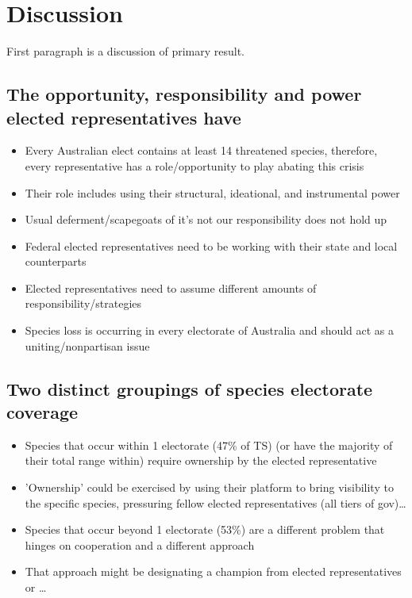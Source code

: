 \documentclass[a4paper,11pt]{article}
\begin{document}
\section{Discussion}

First paragraph is a discussion of primary result.

\subsection{The opportunity, responsibility and power elected representatives have}

\begin{itemize}
    \item Every Australian elect contains at least 14 threatened species, therefore, every representative has a role/opportunity to play abating this crisis
    \item Their role includes using their structural, ideational, and instrumental power
    \item Usual deferment/scapegoats of it's not our responsibility does not hold up
    \item Federal elected representatives need to be working with their state and local counterparts
    \item Elected representatives need to assume different amounts of responsibility/strategies
    \item Species loss is occurring in every electorate of Australia and should act as a uniting/nonpartisan issue
\end{itemize}

\subsection{Two distinct groupings of species electorate coverage}

\begin{itemize}
    \item Species that occur within 1 electorate (47\% of TS) (or have the majority of their total range within) require ownership by the elected representative
    \item 'Ownership' could be exercised by using their platform to bring visibility to the specific species, pressuring fellow elected representatives (all tiers of gov)\ldots
    \item Species that occur beyond 1 electorate (53\%) are a different problem that hinges on cooperation and a different approach
    \item That approach might be designating a champion from elected representatives or \ldots
\end{itemize}
\end{document}
